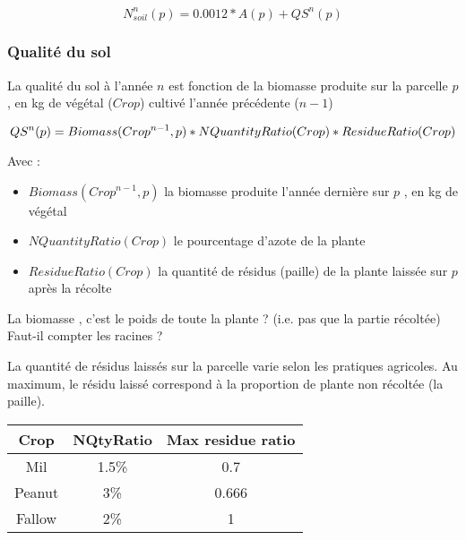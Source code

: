 \documentclass[10pt,a4paper,french]{article} %
\begin{document}
\begin{equation}
N_{soil}^{n}(p) = 0.0012 * A(p) + QS^{n}(p)
\end{equation}



\subsubsection{Qualité du sol}

La qualité du sol à l'année $n$ est fonction de la biomasse produite sur la parcelle $p$ , en kg de végétal ($Crop$) cultivé l'année précédente ($n-1$)


\begin{equation}
QS^{n}(p) = Biomass(Crop^{n-1},p) * NQuantityRatio(Crop) * ResidueRatio(Crop) \\
\end{equation}

Avec  :

\begin{itemize}
	\item $Biomass(Crop^{n-1},p)$  la biomasse produite l'année dernière sur $p$ , en kg de végétal
	\item $NQuantityRatio(Crop)$ le pourcentage d'azote de la plante 
	\item $ResidueRatio(Crop)$  la quantité de résidus (paille) de la plante laissée sur  $p$ après la récolte
\end{itemize}



\begin{tcolorbox}[noparskip,
    colback=LightGreen,colframe=DarkGreen,%
    colbacklower=LimeGreen!75!LightGreen,%
    title=Question]
La biomasse , c'est le poids de toute la plante ? (i.e. pas que la partie  récoltée)
Faut-il compter les racines ? 
\end{tcolorbox}






La quantité de résidus laissés sur la parcelle varie selon les pratiques agricoles.
Au maximum, le résidu laissé correspond à la proportion de plante non récoltée (la paille).



\begin{table}[h!]
\begin{tabular}{|c|c|c|}
\hline
\textbf{Crop}          & \textbf{NQtyRatio}    & \textbf{Max residue ratio} \\ \hline
Mil                    & 1.5\%                 & 0.7                        \\ \hline
Peanut                 & 3\%                   & 0.666                      \\ \hline
Fallow                 & 2\%                   & 1                          \\ \hline
\end{tabular}
\end{table}
\end{document}
